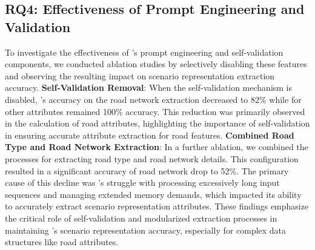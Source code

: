 \subsection{RQ4: Effectiveness of Prompt Engineering and Validation}
To investigate the effectiveness of {\tool}'s prompt engineering and self-validation components, we conducted ablation studies by selectively disabling these features and observing the resulting impact on scenario representation extraction accuracy. \textbf{Self-Validation Removal}: When the self-validation mechanism is disabled, {\tool}’s accuracy on the road network extraction decreased to 82\% while for other attributes remained 100\% accuracy. This reduction was primarily observed in the calculation of road attributes, highlighting the importance of self-validation in ensuring accurate attribute extraction for road features.
\textbf{Combined Road Type and Road Network Extraction}: In a further ablation, we combined the processes for extracting road type and road network details. This configuration resulted in a significant accuracy of road network drop to 52\%. The primary cause of this decline was {\tool}’s struggle with processing excessively long input sequences and managing extended memory demands, which impacted its ability to accurately extract scenario representation attributes. These findings emphasize the critical role of self-validation and modularized extraction processes in maintaining {\tool}'s scenario representation accuracy, especially for complex data structures like road attributes.
\vspace{-2mm}